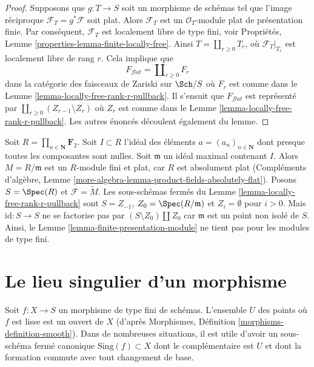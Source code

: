 \begin{proof}
Supposons que  $g : T \to S$  soit un morphisme de schémas tel que l'image réciproque
 $\mathcal{F}_T = g^*\mathcal{F}$  soit plat. Alors  $\mathcal{F}_T$  est un  $\mathcal{O}_T$-module plat de
présentation finie. Par conséquent,  $\mathcal{F}_T$  est localement libre de type fini,
voir Propriétés, Lemme  \ref{properties-lemma-finite-locally-free}. Ainsi  $T = \coprod_{r \geq 0} T_r$, où  $\mathcal{F}_T|_{T_r}$  est
localement libre de rang  $r$. Cela implique que
$$
F_{flat} = \coprod\nolimits_{r \geq 0} F_r
$$
dans la catégorie des faisceaux de Zariski sur  $\Sch/S$  où  $F_r$  est
comme dans le Lemme  \ref{lemma-locally-free-rank-r-pullback}. Il s'ensuit que  $F_{flat}$  est représenté par
 $\coprod_{r \geq 0} (Z_{r - 1} \setminus Z_r)$  où  $Z_r$  est comme dans le Lemme  \ref{lemma-locally-free-rank-r-pullback}. Les autres
énoncés découlent également du lemme.
\end{proof}

\begin{example}
\label{example-not-fp-MB}
Soit  $R = \prod_{n \in \mathbf{N}} \mathbf{F}_2$. Soit  $I \subset R$  l'idéal des éléments  $a = (a_n)_{n \in \mathbf{N}}$  dont
presque toutes les composantes sont nulles. Soit  $\mathfrak m$  un idéal maximal
contenant  $I$. Alors  $M = R/\mathfrak m$  est un  $R$-module fini et
plat, car  $R$  est absolument plat (Compléments d'algèbre, Lemme  \ref{more-algebra-lemma-product-fields-absolutely-flat}).
Posons  $S = \Spec(R)$  et  $\mathcal{F} = \widetilde{M}$. Les sous-schémas fermés du Lemme  \ref{lemma-locally-free-rank-r-pullback} 
sont  $S = Z_{-1}$,  $Z_0 = \Spec(R/\mathfrak m)$ et  $Z_i = \emptyset$  pour  $i > 0$. Mais
 $\text{id} : S \to S$  ne se factorise pas par  $(S \setminus Z_0) \amalg Z_0$  car  $\mathfrak m$  est un point
non isolé de  $S$. Ainsi, le Lemme  \ref{lemma-finite-presentation-module}  ne tient pas pour les
modules de type fini.
\end{example}







\section{Le lieu singulier d'un morphisme}
\label{section-singular-locus-morphism}

\noindent
Soit  $f : X \to S$  un morphisme de type fini de schémas. L'ensemble  $U$ 
des points où  $f$  est lisse est un ouvert de  $X$  (d'après
Morphismes, Définition  \ref{morphisms-definition-smooth}). Dans de nombreuses situations, il est utile
d'avoir un sous-schéma fermé canonique  $\text{Sing}(f) \subset X$  dont le complémentaire est
 $U$  et dont la formation commute avec tout changement de base.

